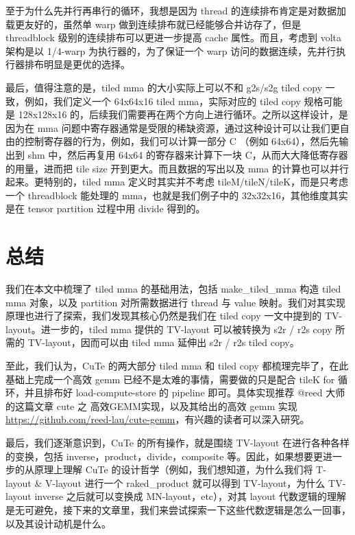 至于为什么先并行再串行的循环，我想是因为 thread 的连续排布肯定是对数据加载更友好的，虽然单 warp 做到连续排布就已经能够合并访存了，但是 threadblock 级别的连续排布可以更进一步提高 cache 属性。而且，考虑到 volta 架构是以 1/4-warp 为执行器的，为了保证一个 warp 访问的数据连续，先并行执行器排布明显是更优的选择。

最后，值得注意的是，tiled mma 的大小实际上可以不和 g2s/s2g tiled copy 一致，例如，我们定义一个 64x64x16 tiled mma，实际对应的 tiled copy 规格可能是 128x128x16 的，后续我们需要再在两个方向上进行循环。之所以这样设计，是因为在 mma 问题中寄存器通常是受限的稀缺资源，通过这种设计可以让我们更自由的控制寄存器的行为，例如，我们可以计算一部分 C （例如 64x64），然后先输出到 shm 中，然后再复用 64x64 的寄存器来计算下一块 C，从而大大降低寄存器的用量，进而把 tile size 开到更大。而且数据的写出以及 mma 的计算也可以并行起来。更特别的，tiled mma 定义时其实并不考虑 tileM/tileN/tileK，而是只考虑一个 threadblock 能处理的 mma，也就是我们例子中的 32x32x16，其他维度其实是在 tensor partition 过程中用 divide 得到的。

\section{总结}

我们在本文中梳理了 tiled mma 的基础用法，包括 make\_tiled\_mma 构造 tiled mma 对象，以及 partition 对所需数据进行 thread 与 value 映射。我们对其实现原理也进行了探索，我们发现其核心仍然是我们在 tiled copy 一文中提到的 TV-layout。进一步的，tiled mma 提供的 TV-layout 可以被转换为 s2r / r2s copy 所需的 TV-layout，因而可以由 tiled mma 延伸出 s2r / r2s tiled copy。

至此，我们认为，CuTe 的两大部分 tiled mma 和 tiled copy 都梳理完毕了，在此基础上完成一个高效 gemm 已经不是太难的事情，需要做的只是配合 tileK for 循环，并且排布好 load-compute-store 的 pipeline 即可。具体实现推荐 @reed 大师的这篇文章 cute 之 高效GEMM实现，以及其给出的高效 gemm 实现 \url{https://github.com/reed-lau/cute-gemm}，有兴趣的读者可以深入研究。

最后，我们逐渐意识到，CuTe 的所有操作，就是围绕 TV-layout 在进行各种各样的变换，包括 inverse，product，divide，composite 等。因此，如果想要更进一步的从原理上理解 CuTe 的设计哲学（例如，我们想知道，为什么我们将 T-layout \& V-layout 进行一个 raked\_product 就可以得到 TV-layout，为什么 TV-layout inverse 之后就可以变换成 MN-layout，etc），对其 layout 代数逻辑的理解是无可避免，接下来的文章里，我们来尝试探索一下这些代数逻辑是怎么一回事，以及其设计动机是什么。
